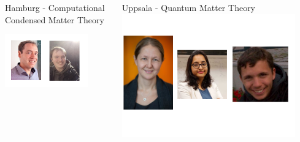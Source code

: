 \documentclass[aspectratio=169]{beamer}
\title{}
\author{Tjark Sievers}
\date{May 2025}
\institute[I. ITP - Computational Condensed Matter Theory]{I. Institute of Theoretical Physics}
\begin{document}
	

{
\begin{frame}
	\titlepage
\end{frame}
}
\addtocounter{framenumber}{-1}

\begin{frame}
	
	\begin{columns}[T]
		\begin{column}{0.5\textwidth}
			\begin{center}
				Hamburg - Computational Condensed Matter Theory
				
				\includegraphics[width=0.8\textwidth]{figs/People Tim.png}
			\end{center}	
		\end{column}
		\begin{column}{0.5\textwidth}
			\begin{center}
				Uppsala - Quantum Matter Theory
				\includegraphics[width=0.9\textwidth]{figs/People Annica.png}
			\end{center}
		\end{column}
	\end{columns}
\end{frame}
\end{document}
